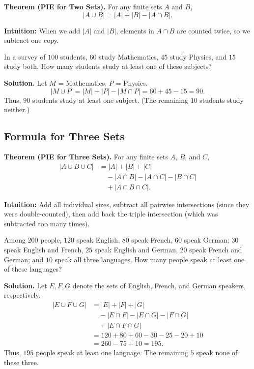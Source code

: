 \documentclass[11pt,a4paper]{article}
\begin{document}
\textbf{Theorem (PIE for Two Sets).} For any finite sets $A$ and $B$,
\begin{equation*}
    |A \cup B| = |A| + |B| - |A \cap B|.
\end{equation*}

\textbf{Intuition:} When we add $|A|$ and $|B|$, elements in $A \cap B$ are counted twice, so we subtract one copy.

\begin{example}
In a survey of $100$ students, $60$ study Mathematics, $45$ study Physics, and $15$ study both. How many students study at least one of these subjects?

\textbf{Solution.}
Let $M$ = Mathematics, $P$ = Physics.
\begin{equation*}
    |M \cup P| = |M| + |P| - |M \cap P| = 60 + 45 - 15 = 90.
\end{equation*}
Thus, $90$ students study at least one subject. (The remaining $10$ students study neither.)
\end{example}

\subsection{Formula for Three Sets}

\textbf{Theorem (PIE for Three Sets).} For any finite sets $A$, $B$, and $C$,
\begin{align*}
    |A \cup B \cup C| &= |A| + |B| + |C| \\
    &\quad - |A \cap B| - |A \cap C| - |B \cap C| \\
    &\quad + |A \cap B \cap C|.
\end{align*}

\textbf{Intuition:} Add all individual sizes, subtract all pairwise intersections (since they were double-counted), then add back the triple intersection (which was subtracted too many times).

\begin{example}
Among $200$ people, $120$ speak English, $80$ speak French, $60$ speak German; $30$ speak English and French, $25$ speak English and German, $20$ speak French and German; and $10$ speak all three languages. How many people speak at least one of these languages?

\textbf{Solution.} Let $E, F, G$ denote the sets of English, French, and German speakers, respectively.
\begin{align*}
    |E \cup F \cup G| &= |E| + |F| + |G| \\
    &\quad - |E \cap F| - |E \cap G| - |F \cap G| \\
    &\quad + |E \cap F \cap G| \\
    &= 120 + 80 + 60 - 30 - 25 - 20 + 10 \\
    &= 260 - 75 + 10 = 195.
\end{align*}
Thus, $195$ people speak at least one language. The remaining $5$ speak none of these three.
\end{example}
\end{document}
